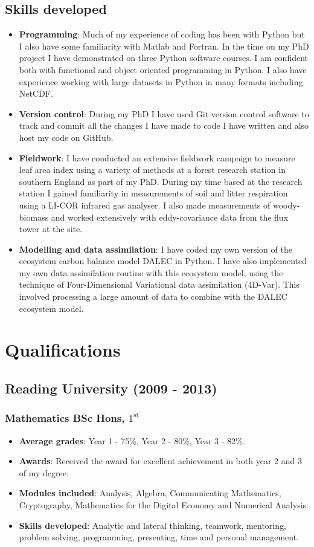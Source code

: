 \documentclass[11pt]{article}
\begin{document}
\subsection*{Skills developed}
\begin{itemize}
\item \textbf{Programming}: Much of my experience of coding has been with Python but I also have some familiarity with Matlab and Fortran. In the time on my PhD project I have demonstrated on three Python software courses. I am confident both with functional and object oriented programming in Python. I also have experience working with large datasets in Python in many formats including NetCDF. 
\item \textbf{Version control}: During my PhD I have used Git version control software to track and commit all the changes I have made to code I have written and also host my code on GitHub. 
\item \textbf{Fieldwork}: I have conducted an extensive fieldwork campaign to measure leaf area index using a variety of methods at a forest research station in southern England as part of my PhD. During my time based at the research station I gained familiarity in measurements of soil and litter respiration using a LI-COR infrared gas analyser. I also made measurements of woody-biomass and worked extensively with eddy-covariance data from the flux tower at the site. 
\item \textbf{Modelling and data assimilation}: I have coded my own version of the ecosystem carbon balance model DALEC in Python. I have also implemented my own data assimilation routine with this ecosystem model, using the technique of Four-Dimensional Variational data assimilation (4D-Var). This involved processing a large amount of data to combine with the DALEC ecosystem model.
\end{itemize}

\section*{Qualifications}
\subsection*{Reading University (2009 - 2013)}
\subsubsection*{Mathematics BSc Hons, \(1^{\text{st}}\)}
\begin{itemize}
\item \textbf{Average grades}: Year 1 - 75\%, Year 2 - 80\%, Year 3 - 82\%.
\item \textbf{Awards}: Received the award for excellent achievement in both year 2 and 3 of my degree.
\item \textbf{Modules included}: Analysis, Algebra, Communicating Mathematics, Cryptography, Mathematics for the Digital Economy and Numerical Analysis.
\item \textbf{Skills developed}: Analytic and lateral thinking, teamwork, mentoring, problem solving, programming, presenting, time and personal management.
\end{itemize}
\end{document}
